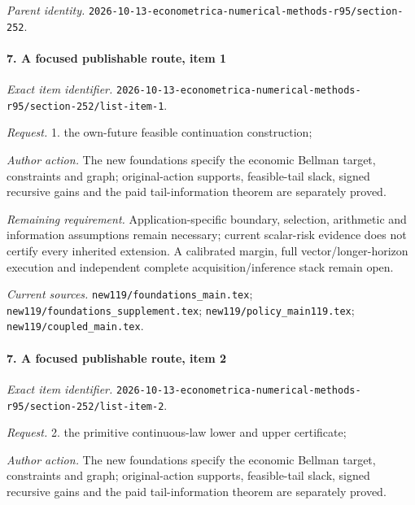 \par\emph{Parent identity.} \nolinkurl{2026-10-13-econometrica-numerical-methods-r95/section-252}.

\paragraph{7. A focused publishable route, item 1}

\emph{Exact item identifier.} \nolinkurl{2026-10-13-econometrica-numerical-methods-r95/section-252/list-item-1}.

\par\emph{Request.} 1. the own-future feasible continuation construction;

\par\emph{Author action.} The new foundations specify the economic Bellman target, constraints and graph; original-action supports, feasible-tail slack, signed recursive gains and the paid tail-information theorem are separately proved.

\par\emph{Remaining requirement.} Application-specific boundary, selection, arithmetic and information assumptions remain necessary; current scalar-risk evidence does not certify every inherited extension. A calibrated margin, full vector/\allowbreak{}longer-horizon execution and independent complete acquisition/\allowbreak{}inference stack remain open.

\par\emph{Current sources.} \nolinkurl{new119/foundations_main.tex}; \nolinkurl{new119/foundations_supplement.tex}; \nolinkurl{new119/policy_main119.tex}; \nolinkurl{new119/coupled_main.tex}.

\paragraph{7. A focused publishable route, item 2}

\emph{Exact item identifier.} \nolinkurl{2026-10-13-econometrica-numerical-methods-r95/section-252/list-item-2}.

\par\emph{Request.} 2. the primitive continuous-law lower and upper certificate;

\par\emph{Author action.} The new foundations specify the economic Bellman target, constraints and graph; original-action supports, feasible-tail slack, signed recursive gains and the paid tail-information theorem are separately proved.

